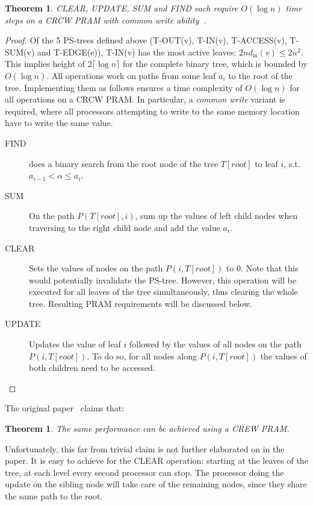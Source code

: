 \documentclass[a4paper,10pt, twocolumn]{article}
\newtheorem{theorem}[lemma]{Theorem}
\begin{document}
\begin{theorem}
CLEAR, UPDATE, SUM and FIND each require $O(\log n)$ time steps on a CRCW PRAM with common write ability~\cite{yossi81}.
\end{theorem}
\begin{proof}
Of the 5 PS-trees defined above (T-OUT(v), T-IN(v), T-ACCESS(v), T-SUM(v) and T-EDGE(e)), T-IN(v) has the most active leaves: $2nd_{\mathrm{in}}(v) \leq 2n^2$. This implies height of $2 \lceil \log n \rceil$ for the complete binary tree, which is bounded by $O(\log n)$. All operations work on paths from some leaf $a_i$ to the root of the tree. Implementing them as follows ensures a time complexity of $O(\log n)$ for all operations on a CRCW PRAM. In particular, a \emph{common write} variant is required, where all processors attempting to write to the same memory location have to write the same value.
\begin{description}
	\item [FIND] does a binary search from the root node of the tree $T[root]$ to leaf $i$, s.t. $a_{i-1} < \alpha \leq a_i$. 
	\item [SUM] On the path $P(T[root], i)$, sum up the values of left child nodes when traversing to the right child node and add the value $a_i$.
	\item [CLEAR] Sets the values of nodes on the path $P(i, T[root])$ to 0. Note that this would potentially invalidate the PS-tree. However, this operation will be executed for all leaves of the tree simultaneously, thus clearing the whole tree. Resulting PRAM requirements will be discussed below.
	\item [UPDATE] Updates the value of leaf $i$ followed by the values of all nodes on the path $P(i, T[root])$. To do so, for all nodes along $P(i, T[root])$ the values of both children need to be accessed.
\end{description}
\end{proof}

The original paper~\cite{yossi81} claims that:
\begin{theorem}
The same performance can be achieved using a CREW PRAM.
\end{theorem}

Unfortunately, this far from trivial claim is not further elaborated on in the paper. It is easy to achieve for the CLEAR operation: starting at the leaves of the tree, at each level every second processor can stop. The processor doing the update on the sibling node will take care of the remaining nodes, since they share the same path to the root. 
\end{document}
